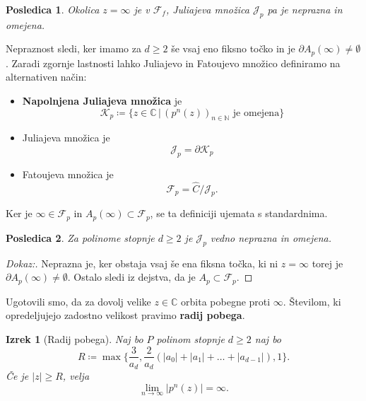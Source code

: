 \documentclass{article}
\newtheorem{posledica}{Posledica}
\newtheorem{izrek}{Izrek}
\newcommand{\C}{\mathbb{C}}
\newcommand{\N}{\mathbb{N}}
\newcommand{\F}{\mathcal{F}}
\begin{document}
\begin{posledica}
Okolica $z = \infty$ je v $\F_f$, Juliajeva množica $\mathcal{J}_p$ pa je 
neprazna in omejena.
\end{posledica}
Nepraznost sledi, ker imamo za $d \geq 2$ še vsaj eno fiksno točko 
in je $\partial A_p(\infty) \neq \emptyset$.
Zaradi zgornje lastnosti lahko Juliajevo in Fatoujevo množico definiramo na alternativen način:
\begin{itemize}
    \item \textbf{Napolnjena Juliajeva množica} je  
$$
\mathcal{K}_p \coloneqq \{z\in \C \,|\, (p^n(z))_{n\in\N}\text{ je omejena}\}
$$
\item Juliajeva množica je 
$$
\mathcal{J}_p = \partial \mathcal{K}_p
$$
\item Fatoujeva množica je 
 $$\mathcal{F}_p = \hat{C}\slash \mathcal{J}_p.$$
\end{itemize}
Ker je $\infty \in \F_p$ in $A_p(\infty) \subset \F_p$, se ta definiciji 
ujemata s standardnima. 

\begin{posledica}
Za polinome stopnje $d\geq 2$ je $\mathcal{J}_p$ vedno neprazna in omejena.
\end{posledica}

\begin{proof}[Dokaz:]
    Neprazna je, ker obstaja vsaj še ena fiksna točka, ki ni $z = \infty$
    torej je $\partial A_p(\infty) \neq \emptyset$. Ostalo sledi iz dejstva, 
    da je $A_p \subset \F_p$.
\end{proof}

Ugotovili smo, da za dovolj velike $z\in \C$ orbita pobegne proti $\infty$.
Številom, ki opredeljujejo zadostno velikost pravimo \textbf{radij pobega}.

\begin{izrek}[Radij pobega]
Naj bo $P$ polinom stopnje $d\geq 2$ naj bo 
\begin{equation}
R \coloneqq \max\Big\{\frac{3}{a_d}, \frac{2}{a_d}(|a_0| + |a_1| + \dots + |a_{d-1}|)
, 1 \Big\}.
\end{equation}
Če je $|z| \geq R$, velja 
\begin{equation}
\lim_{n\rightarrow \infty} |p^n(z)| = \infty.
\end{equation}
\end{izrek}
\end{document}

